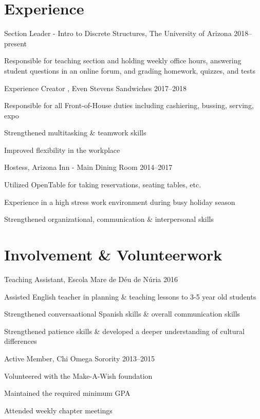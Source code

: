 \documentclass[]{friggeri-cv} %
\begin{document}
\section{Experience}
\begin{entrylist}

\entry%
{Section Leader - Intro to Discrete Structures{\normalfont , The University of Arizona}}%
{2018--present}
{%
	\item{Responsible for teaching section and holding weekly office hours, answering student questions in an online forum, and grading homework, quizzes, and tests}
}
\entry
{Experience Creator {\normalfont , Even Stevens Sandwiches}}
{2017--2018}
{%
	\item{Responsible for all Front-of-House duties including cashiering, bussing, serving, expo}
	\item{Strengthened multitasking \& teamwork skills}
	\item{Improved flexibility in the workplace}
}
\entry
{Hostess{\normalfont , Arizona Inn - Main Dining Room}}
{2014--2017}
{%
		\item{Utilized OpenTable for taking reservations, seating tables, etc.}
		\item{Experience in a high stress work environment during busy holiday season}
		\item{Strengthened organizational, communication \& interpersonal skills}%
}


\end{entrylist}

\section{Involvement \& Volunteerwork}
\begin{entrylist}
\entry
{Teaching Assistant{\normalfont , Escola Mare de D\'eu de N\'uria}}
{2016}
{
	\item{Assisted English teacher in planning \& teaching lessons to 3-5 year old students}
	\item{Strengthened conversaational Spanish skills \& overall communication skills}
	\item{Strengthened patience skills \& developed a deeper understanding of cultural differences}
}

\entry
{Active Member{\normalfont , Chi Omega Sorority}}
{2013--2015}
{
	\item{Volunteered with the Make-A-Wish foundation}
	\item{Maintained the required minimum GPA}
	\item{Attended weekly chapter meetings}
}
\end{entrylist}
\end{document}
